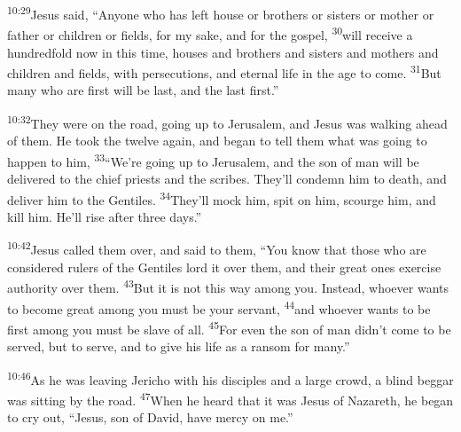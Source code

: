 \documentclass[openany,12pt,english]{book}
\newenvironment{para}{\par\pretolerance=100\tolerance=200\setlength{\emergencystretch}{0.6em}\relax}{\par}
\begin{document}
\begin{para}
    \textsuperscript{10:29}\thinspace{}Jesus said, “Any\-one who has left house or brothers or sisters or moth\-er or fa\-ther or chil\-dren or fields, for my sa\-ke, and for the gos\-pel,
    \textsuperscript{30}\thinspace{}will re\-ceive a hun\-dred\-fold now in this time, hous\-es and brothers and sisters and mothers and chil\-dren and fields, with persecutions, and e\-ter\-nal life in the age to come.
    \textsuperscript{31}\thinspace{}But man\-y who are first will be last, and the last first.”
\end{para}

\bigskip{}

\begin{para}
    \textsuperscript{10:32}\thinspace{}They were on the road, go\-ing up to Je\-ru\-sa\-lem, and Jesus was walk\-ing a\-head of them. He took the twelve a\-gain, and be\-gan to tell them what was go\-ing to hap\-pen to him,
    \textsuperscript{33}\thinspace{}“We're go\-ing up to Je\-ru\-sa\-lem, and the son of man will be delivered to the chief priests and the scribes. They'll con\-demn him to death, and de\-liv\-er him to the Gentiles.
    \textsuperscript{34}\thinspace{}They'll mock him, spit on him, scourge him, and kill him. He'll rise af\-ter three days.”
\end{para}

\bigskip{}

\begin{para}
    \textsuperscript{10:42}\thinspace{}Jesus called them o\-ver, and said to them, “You know that those who are con\-sid\-ered rulers of the Gentiles lord it o\-ver them, and their great ones ex\-er\-cise au\-thor\-i\-ty o\-ver them.
    \textsuperscript{43}\thinspace{}But it is not this way a\-mong you. In\-stead, who\-ev\-er wants to be\-come great a\-mong you must be your serv\-ant,
    \textsuperscript{44}\thinspace{}and who\-ev\-er wants to be first a\-mong you must be slave of all.
    \textsuperscript{45}\thinspace{}For e\-ven the son of man did\-n't come to be served, but to serve, and to give his life as a ran\-som for man\-y.”
\end{para}

\bigskip{}

\begin{para}
    \textsuperscript{10:46}\thinspace{}As he was leav\-ing Jericho with his disciples and a large crowd, a blind beg\-gar was sit\-ting by the road.
    \textsuperscript{47}\thinspace{}When he heard that it was Jesus of Na\-za\-reth, he be\-gan to cry out, “Jesus, son of David, have mer\-cy on me.”
\end{para}
\end{document}

